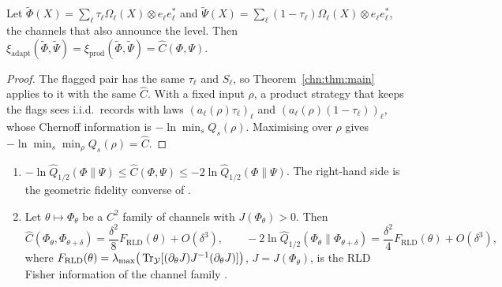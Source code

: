 \begin{proposition}\label{chn:prop:flag}
Let $\widetilde\Phi(X)=\sum_\ell\tau_\ell\Omega_\ell(X)\otimes e_\ell e_\ell^*$ and $\widetilde\Psi(X)=\sum_\ell(1-\tau_\ell)\Omega_\ell(X)\otimes e_\ell e_\ell^*$, the channels that also announce the level. Then $\xi_{\mathrm{adapt}}(\widetilde\Phi,\widetilde\Psi)=\xi_{\mathrm{prod}}(\widetilde\Phi,\widetilde\Psi)=\widehat C(\Phi,\Psi)$.
\end{proposition}

\begin{proof}
The flagged pair has the same $\tau_\ell$ and $S_\ell$, so Theorem~\ref{chn:thm:main} applies to it with the same $\widehat C$. With a fixed input $\rho$, a product strategy that keeps the flags sees i.i.d.\ records with laws $(a_\ell(\rho)\tau_\ell)_\ell$ and $(a_\ell(\rho)(1-\tau_\ell))_\ell$, whose Chernoff information is $-\ln\min_sQ_s(\rho)$. Maximising over $\rho$ gives $-\ln\min_s\min_\rho Q_s(\rho)=\widehat C$.
\end{proof}

\begin{corollary}\label{chn:cor:compare}
\begin{enumerate}
\item[(a)] $-\ln\widehat Q_{1/2}(\Phi\|\Psi)\le\widehat C(\Phi,\Psi)\le-2\ln\widehat Q_{1/2}(\Phi\|\Psi)$. The right-hand side is the geometric fidelity converse of \cite{KatariyaWilde2021,NuradhaWilde2025}.
\item[(b)] Let $\theta\mapsto\Phi_\theta$ be a $C^2$ family of channels with $J(\Phi_\theta)>0$. Then
\[
\widehat C(\Phi_\theta,\Phi_{\theta+\delta})=\frac{\delta^2}{8}F_{\mathrm{RLD}}(\theta)+O(\delta^3),\qquad-2\ln\widehat Q_{1/2}(\Phi_\theta\|\Phi_{\theta+\delta})=\frac{\delta^2}{4}F_{\mathrm{RLD}}(\theta)+O(\delta^3),
\]
where $F_{\mathrm{RLD}}(\theta)=\lambda_{\max}\big(\operatorname{Tr}_{\mathcal Y}[(\partial_\theta J)J^{-1}(\partial_\theta J)]\big)$, $J=J(\Phi_\theta)$, is the RLD Fisher information of the channel family \cite{KatariyaWilde2021}.
\end{enumerate}
\end{corollary}

